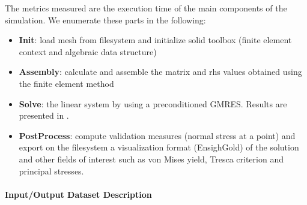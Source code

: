 The metrics measured are the execution time of the main components of the simulation. We enumerate these parts in the following:
\begin{itemize}
\item \textbf{Init}: load mesh from filesystem and initialize solid toolbox (finite element context and algebraic data structure)
\item \textbf{Assembly}: calculate and assemble the matrix and rhs values obtained using the finite element method
\item \textbf{Solve}: the linear system by using a preconditioned GMRES. Results
  are presented in .
\item \textbf{PostProcess}: compute validation measures (normal stress at a point)
  and export on the filesystem a visualization format (EnsighGold) of the
  solution and other fields of interest such as von Mises yield, Tresca criterion and
  principal stresses.
\end{itemize}

\paragraph{Input/Output Dataset Description}

